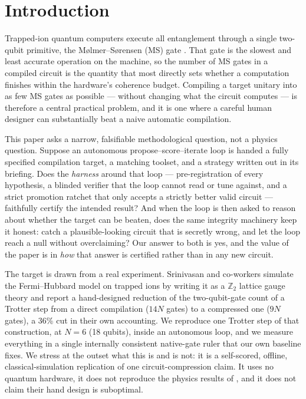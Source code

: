 \documentclass[11pt]{article}
\begin{document}
\section{Introduction}

Trapped-ion quantum computers execute all entanglement through a single
two-qubit primitive, the M{\o}lmer--S{\o}rensen (MS) gate \cite{Sorensen1999}.
That gate is the slowest and least accurate operation on the machine, so the
number of MS gates in a compiled circuit is the quantity that most directly sets
whether a computation finishes within the hardware's coherence budget. Compiling a
target unitary into as few MS gates as possible --- without changing what the
circuit computes --- is therefore a central practical problem, and it is one where
a careful human designer can substantially beat a naive automatic compilation.

This paper asks a narrow, falsifiable methodological question, not a physics
question. Suppose an autonomous propose--score--iterate loop is handed a fully
specified compilation target, a matching toolset, and a strategy written out in its
briefing. Does the \emph{harness} around that loop --- pre-registration of every
hypothesis, a blinded verifier that the loop cannot read or tune against, and a
strict promotion ratchet that only accepts a strictly better valid circuit ---
faithfully certify the intended result? And when the loop is then asked to reason
about whether the target can be beaten, does the same integrity machinery keep it
honest: catch a plausible-looking circuit that is secretly wrong, and let the loop
reach a null without overclaiming? Our answer to both is yes, and the value of the
paper is in \emph{how} that answer is certified rather than in any new circuit.

The target is drawn from a real experiment. Srinivasan and co-workers
\cite{Srinivasan2024} simulate the Fermi--Hubbard model on trapped ions by writing
it as a $\mathbb{Z}_2$ lattice gauge theory and report a hand-designed reduction of
the two-qubit-gate count of a Trotter step from a direct compilation ($14N$ gates)
to a compressed one ($9N$ gates), a 36\% cut in their own accounting. We reproduce
one Trotter step of that construction, at $N=6$ (18 qubits), inside an autonomous
loop, and we measure everything in a single internally consistent native-gate ruler
that our own baseline fixes. We stress at the outset what this is and is not: it is
a self-scored, offline, classical-simulation replication of one circuit-compression
claim. It uses no quantum hardware, it does not reproduce the physics results of
\cite{Srinivasan2024}, and it does not claim their hand design is suboptimal.
\end{document}
